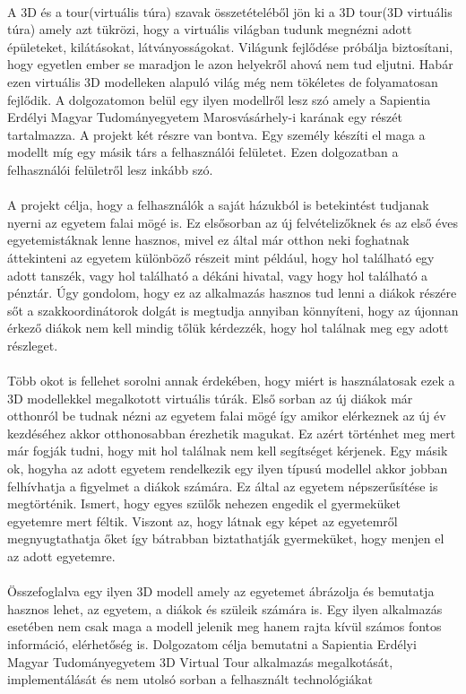 	\paragraph{}
	A 3D és a tour(virtuális túra) szavak összetételéből jön ki a 3D tour(3D virtuális túra) amely azt tükrözi, hogy a virtuális világban tudunk megnézni adott épületeket, kilátásokat, látványosságokat. Világunk fejlődése próbálja biztosítani, hogy egyetlen ember se maradjon le azon helyekről ahová nem tud eljutni. Habár ezen virtuális 3D modelleken alapuló világ még nem tökéletes de folyamatosan fejlődik. A dolgozatomon belül egy ilyen modellről lesz szó amely a Sapientia Erdélyi Magyar Tudományegyetem Marosvásárhely-i karának egy részét tartalmazza. A projekt két részre van bontva. Egy személy készíti el maga a modellt míg egy másik társ a felhasználói felületet. Ezen dolgozatban a felhasználói felületről lesz inkább szó. 
	\paragraph{}
	A projekt célja, hogy a felhasználók a saját házukból is betekintést tudjanak nyerni az egyetem falai mögé is. Ez elsősorban az új felvételizőknek és az első éves egyetemistáknak lenne hasznos, mivel ez által már otthon neki foghatnak áttekinteni az egyetem különböző részeit mint például, hogy hol található egy adott tanszék, vagy hol található a dékáni hivatal, vagy hogy hol található a pénztár. Úgy gondolom, hogy ez az alkalmazás hasznos tud lenni a diákok részére sőt a szakkoordinátorok dolgát is megtudja annyiban könnyíteni, hogy az újonnan érkező diákok nem kell mindig tőlük kérdezzék, hogy hol találnak meg egy adott részleget.
	\paragraph{}
	Több okot is fellehet sorolni annak érdekében, hogy miért is használatosak ezek a 3D modellekkel megalkotott virtuális túrák. Első sorban az új diákok már otthonról be tudnak nézni az egyetem falai mögé így amikor elérkeznek az új év kezdéséhez akkor otthonosabban érezhetik magukat. Ez azért történhet meg mert már fogják tudni, hogy mit hol találnak nem kell segítséget kérjenek. Egy másik ok, hogyha az adott egyetem rendelkezik egy ilyen típusú modellel akkor jobban felhívhatja a figyelmet a diákok számára. Ez által az egyetem népszerűsítése is megtörténik. Ismert, hogy egyes szülők nehezen engedik el gyermeküket egyetemre mert féltik. Viszont az, hogy látnak egy  képet az egyetemről megnyugtathatja őket így bátrabban biztathatják gyermeküket, hogy menjen el az adott egyetemre. 
	\paragraph{}
	Összefoglalva egy ilyen 3D modell amely az egyetemet ábrázolja és bemutatja hasznos lehet, az egyetem, a diákok és szüleik számára is. Egy ilyen alkalmazás esetében nem csak maga a modell jelenik meg hanem rajta kívül számos fontos információ, elérhetőség is. Dolgozatom célja bemutatni a Sapientia Erdélyi Magyar Tudományegyetem 3D Virtual Tour alkalmazás megalkotását, implementálását és nem utolsó sorban a felhasznált technológiákat
	
	
